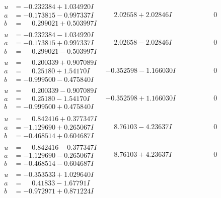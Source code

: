 \documentclass[1p]{elsarticle_modified}
\theoremstyle{definition}
\begin{document}
$$\begin{array}{c|c|c}
\begin{aligned}
u &= -0.232384 + 1.034920 I \\
a &= -0.173815 - 0.997337 I \\
b &= \phantom{-}0.299021 + 0.503997 I\end{aligned}
 & \phantom{-}2.02658 + 2.02846 I & \phantom{-0.000000 } 0 \\ \hline\begin{aligned}
u &= -0.232384 - 1.034920 I \\
a &= -0.173815 + 0.997337 I \\
b &= \phantom{-}0.299021 - 0.503997 I\end{aligned}
 & \phantom{-}2.02658 - 2.02846 I & \phantom{-0.000000 } 0 \\ \hline\begin{aligned}
u &= \phantom{-}0.200339 + 0.907089 I \\
a &= \phantom{-}0.25180 + 1.54170 I \\
b &= -0.999500 - 0.475840 I\end{aligned}
 & -0.352598 - 1.166030 I & \phantom{-0.000000 } 0 \\ \hline\begin{aligned}
u &= \phantom{-}0.200339 - 0.907089 I \\
a &= \phantom{-}0.25180 - 1.54170 I \\
b &= -0.999500 + 0.475840 I\end{aligned}
 & -0.352598 + 1.166030 I & \phantom{-0.000000 } 0 \\ \hline\begin{aligned}
u &= \phantom{-}0.842416 + 0.377347 I \\
a &= -1.129690 + 0.265067 I \\
b &= -0.468514 + 0.604687 I\end{aligned}
 & \phantom{-}8.76103 - 4.23637 I & \phantom{-0.000000 } 0 \\ \hline\begin{aligned}
u &= \phantom{-}0.842416 - 0.377347 I \\
a &= -1.129690 - 0.265067 I \\
b &= -0.468514 - 0.604687 I\end{aligned}
 & \phantom{-}8.76103 + 4.23637 I & \phantom{-0.000000 } 0 \\ \hline\begin{aligned}
u &= -0.353533 + 1.029640 I \\
a &= \phantom{-}0.41833 - 1.67791 I \\
b &= -0.972971 + 0.871224 I\end{aligned}

\end{array}$$
\end{document}
